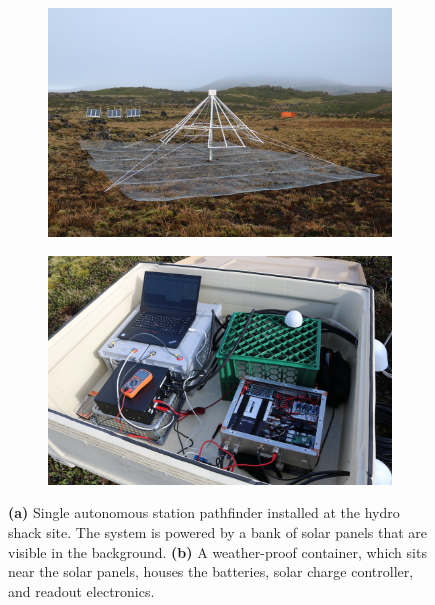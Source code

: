 \documentclass{ws-jai}
\begin{document}
\begin{figure}
    \centering
    \begin{subfigure}[t]{0.48\textwidth}
        \centering
        \includegraphics[width=\linewidth]{Figures/autonomous.jpg} 
        \caption{} \label{Fig:autonomous_antenna}
    \end{subfigure}
    \hfill
    \begin{subfigure}[t]{0.48\textwidth}
      \centering
        \includegraphics[width=\linewidth]{Figures/container.jpg}
        \caption{} \label{Fig:autonomous_electronics}
    \end{subfigure}
    \caption{{\bf (a)} Single autonomous station pathfinder installed
      at the hydro shack site.  The system is powered by a bank of
      solar panels that are visible in the background. {\bf (b)} A
      weather-proof container, which sits near the solar panels,
      houses the batteries, solar charge controller, and readout
      electronics.}\label{Fig:autonomous}
\end{figure}
\end{document}
